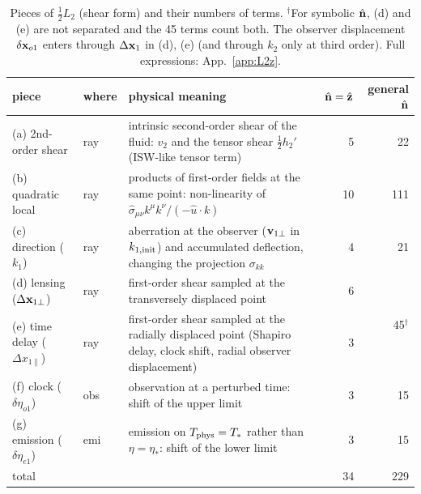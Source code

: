 \begin{table}[t]
\centering\small
\begin{tabular}{@{}p{}lp{}rr@{}}
\hline
piece & where & physical meaning & $\hat{\mathbf n}=\hat{\mathbf z}$ & general $\hat{\mathbf n}$\\ \hline
(a) 2nd-order shear & ray & intrinsic second-order shear of the fluid: $v_2$ and the tensor shear $\tfrac12h_2'$ (ISW-like tensor term) & 5 & 22\\
(b) quadratic local & ray & products of first-order fields at the same point: non-linearity of $\hat\sigma_{\mu\nu}k^\mu k^\nu/(-\hat u\cdot k)$ & 10 & 111\\
(c) direction ($k_1$) & ray & aberration at the observer ($\mathbf v_{1\perp}$ in $k_{1,\rm init}$) and accumulated deflection, changing the projection $\sigma_{kk}$ & 4 & 21\\
(d) lensing ($\Delta\mathbf x_{1\perp}$) & ray & first-order shear sampled at the transversely displaced point & 6 & \multirow{2}{*}{45$^\dagger$}\\
(e) time delay ($\Delta x_{1\parallel}$) & ray & first-order shear sampled at the radially displaced point (Shapiro delay, clock shift, radial observer displacement) & 3 & \\
(f) clock ($\delta\eta_{o1}$) & obs & observation at a perturbed time: shift of the upper limit & 3 & 15\\
(g) emission ($\delta\eta_{e1}$) & emi & emission on $T_{\rm phys}=T_*$ rather than $\eta=\eta_*$: shift of the lower limit & 3 & 15\\
\hline
total & & & 34 & 229\\ \hline
\end{tabular}
\caption{Pieces of $\tfrac12L_2$ (shear form) and their numbers of terms.  $^\dagger$For symbolic $\hat{\mathbf n}$, (d) and (e) are not separated
and the 45 terms count both.  The observer displacement $\delta\mathbf x_{o1}$ enters through $\Delta\mathbf x_1$ in (d), (e) (and through $k_2$ only at
third order).  Full expressions: App.~\ref{app:L2z}.}
\label{tab:L2pieces}
\end{table}

